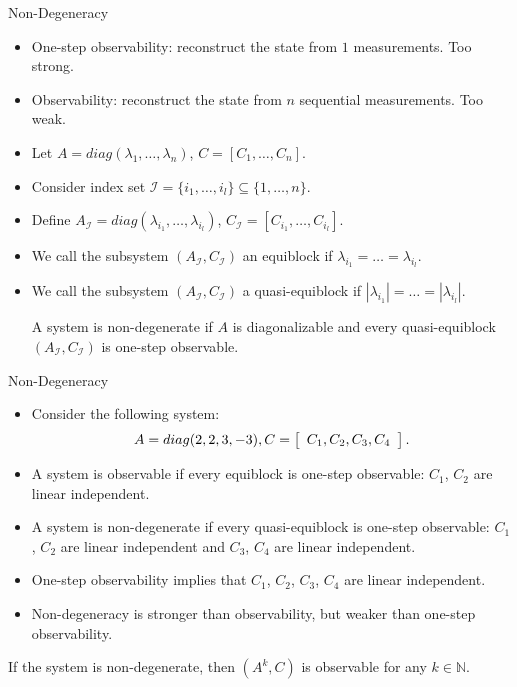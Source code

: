 \documentclass[10pt]{beamer}
\begin{document}
  \begin{frame}{Non-Degeneracy}
    \begin{itemize}
      \item One-step observability: reconstruct the state from $1$ measurements. Too strong. 
      \item Observability: reconstruct the state from $n$ sequential measurements. Too weak.
      \item Let $A = diag(\lambda_1,\ldots,\lambda_n)$, $C = [C_1,\ldots, C_n]$.
      \item Consider index set $\mathcal I = \{i_1,\ldots,i_l\}\subseteq \{1,\ldots,n\}$.
      \item Define $A_{\mathcal I} = diag(\lambda_{i_1},\ldots,\lambda_{i_l})$, $C_{\mathcal I} = [C_{i_1},\ldots,C_{i_l}]$.
      \item We call the subsystem $(A_{\mathcal I}, C_{\mathcal I})$ an equiblock if $\lambda_{i_1}=\ldots=\lambda_{i_l}$. 
      \item We call the subsystem $(A_{\mathcal I}, C_{\mathcal I})$ a quasi-equiblock if $|\lambda_{i_1}|=\ldots=|\lambda_{i_l}|$. 
	\begin{definition}
	  A system is non-degenerate if $A$ is diagonalizable and every quasi-equiblock $(A_{\mathcal I},C_{\mathcal I})$ is one-step observable.
	\end{definition}
    \end{itemize}
  \end{frame}

  \begin{frame}{Non-Degeneracy}
    \begin{itemize}
      \item Consider the following system: 
	\begin{displaymath}
	  \begin{split}
	    A = diag(2,2,3,-3), C = \left[ {\begin{array}{*{20}c}
	      C_1,C_2,C_3,C_4
	    \end{array}} \right].
	  \end{split}
	\end{displaymath}
      \item A system is observable if every equiblock is one-step observable: $C_1$, $C_2$ are linear independent.
      \item A system is non-degenerate if every quasi-equiblock is one-step observable: $C_1$, $C_2$ are linear independent and $C_3$, $C_4$ are linear independent.
      \item One-step observability implies that $C_1$, $C_2$, $C_3$, $C_4$ are linear independent.
      \item Non-degeneracy is stronger than observability, but weaker than one-step observability. 
    \end{itemize}
    \begin{theorem}
      If the system is non-degenerate, then $(A^k,C)$ is observable for any $k\in \mathbb N$. 
    \end{theorem}
  \end{frame}
\end{document}
